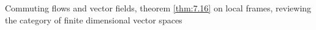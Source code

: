 Commuting flows and vector fields, theorem \ref{thm:7.16} on local frames, reviewing the category of finite dimensional vector spaces